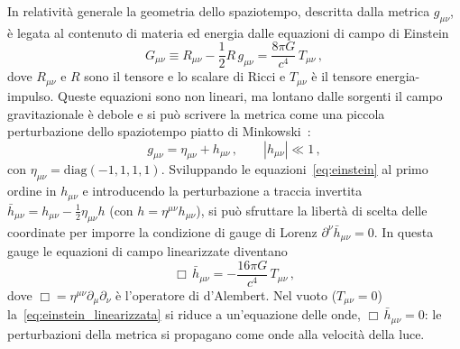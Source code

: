 In relatività generale la geometria dello spaziotempo, descritta dalla metrica $g_{\mu\nu}$, è legata al contenuto di materia ed energia dalle equazioni di campo di Einstein
\begin{equation}
    G_{\mu\nu} \equiv R_{\mu\nu} - \frac{1}{2} R\, g_{\mu\nu} = \frac{8\pi G}{c^4}\, T_{\mu\nu} \, ,
    \label{eq:einstein}
\end{equation}
dove $R_{\mu\nu}$ e $R$ sono il tensore e lo scalare di Ricci e $T_{\mu\nu}$ è il tensore energia-impulso. Queste equazioni sono non lineari, ma lontano dalle sorgenti il campo gravitazionale è debole e si può scrivere la metrica come una piccola perturbazione dello spaziotempo piatto di Minkowski~\cite{Maggiore2008}:
\begin{equation}
    g_{\mu\nu} = \eta_{\mu\nu} + h_{\mu\nu}\, , \qquad |h_{\mu\nu}| \ll 1 \, ,
    \label{eq:metrica_perturbata}
\end{equation}
con $\eta_{\mu\nu} = \mathrm{diag}(-1, 1, 1, 1)$. Sviluppando le equazioni~\eqref{eq:einstein} al primo ordine in $h_{\mu\nu}$ e introducendo la perturbazione a traccia invertita $\bar{h}_{\mu\nu} = h_{\mu\nu} - \frac{1}{2}\eta_{\mu\nu} h$ (con $h = \eta^{\mu\nu}h_{\mu\nu}$), si può sfruttare la libertà di scelta delle coordinate per imporre la condizione di gauge di Lorenz $\partial^{\nu}\bar{h}_{\mu\nu} = 0$. In questa gauge le equazioni di campo linearizzate diventano
\begin{equation}
    \Box\, \bar{h}_{\mu\nu} = -\frac{16\pi G}{c^4}\, T_{\mu\nu}\, ,
    \label{eq:einstein_linearizzata}
\end{equation}
dove $\Box = \eta^{\mu\nu}\partial_\mu\partial_\nu$ è l'operatore di d'Alembert. Nel vuoto ($T_{\mu\nu}=0$) la~\eqref{eq:einstein_linearizzata} si riduce a un'equazione delle onde, $\Box\,\bar{h}_{\mu\nu} = 0$: le perturbazioni della metrica si propagano come onde alla velocità della luce.

